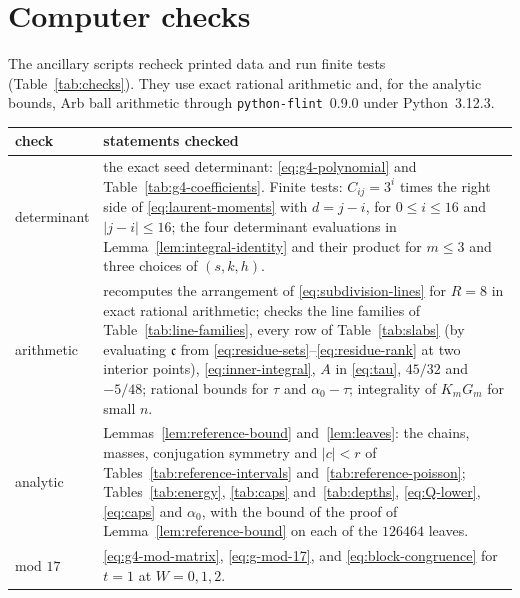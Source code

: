 \documentclass{amsart}
\makeatletter
\numberwithin{equation}{section}
\numberwithin{table}{section}
\newcommand{\captionof}[1]{\def\@captype{#1}\caption}
\newcommand{\Rseam}{8}
\newcommand{\nleaves}{126464}
\makeatother
\begin{document}
\section{Computer checks}\label{app:ver}

The ancillary scripts recheck printed data and run finite tests
(Table~\ref{tab:checks}). They use exact rational arithmetic and, for the
analytic bounds, Arb ball arithmetic \cite{Arb} through
\texttt{python-flint}~0.9.0 under Python~3.12.3.

\begin{center}\small\renewcommand{\arraystretch}{1.12}
\begin{minipage}{\textwidth}\centering
\captionof{table}{Computer checks.}\label{tab:checks}
\begin{tabular}{@{}>{\raggedright\arraybackslash}p{}>{\raggedright\arraybackslash}p{}@{}}
\hline
check & statements checked\\\hline
determinant&the exact seed determinant:
\eqref{eq:g4-polynomial} and Table~\ref{tab:g4-coefficients}. Finite tests:
$C_{ij}=3^i$ times the right side of \eqref{eq:laurent-moments} with
$d=j-i$, for $0\le i\le16$ and $|j-i|\le16$; the four
determinant evaluations in Lemma~\ref{lem:integral-identity} and their
product for $m\le3$ and three choices of $(s,k,h)$.\\
arithmetic&recomputes the arrangement of
\eqref{eq:subdivision-lines} for $R=\Rseam$ in exact rational arithmetic;
checks the line families of Table~\ref{tab:line-families}, every row of
Table~\ref{tab:slabs} (by evaluating $\mathfrak c$ from
\eqref{eq:residue-sets}--\eqref{eq:residue-rank} at two interior points),
\eqref{eq:inner-integral}, $A$ in \eqref{eq:tau}, $45/32$ and $-5/48$; rational
bounds for $\tau$ and $\alpha_0-\tau$; integrality of $K_mG_m$ for small $n$.\\
analytic&Lemmas~\ref{lem:reference-bound} and~\ref{lem:leaves}: the
chains, masses, conjugation symmetry and $|c|<r$ of
Tables~\ref{tab:reference-intervals} and~\ref{tab:reference-poisson};
Tables~\ref{tab:energy}, \ref{tab:caps} and~\ref{tab:depths},
\eqref{eq:Q-lower}, \eqref{eq:caps} and $\alpha_0$, with the bound of the
proof of Lemma~\ref{lem:reference-bound} on each of the $\nleaves$ leaves.\\
mod $17$&\eqref{eq:g4-mod-matrix}, \eqref{eq:g-mod-17}, and
\eqref{eq:block-congruence} for $t=1$ at $W=0,1,2$.\\\hline
\end{tabular}
\end{minipage}
\end{center}
\end{document}
